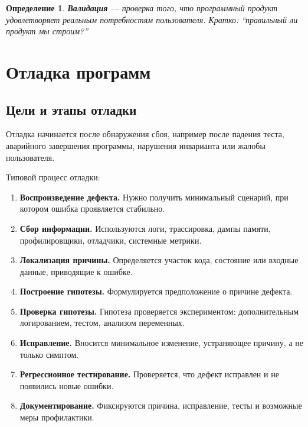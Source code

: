 \documentclass[12pt,a4paper]{article}
\newtheorem{definition}{Определение}
\begin{document}
\begin{definition}
\textbf{Валидация} --- проверка того, что программный продукт удовлетворяет реальным потребностям пользователя. Кратко: ``правильный ли продукт мы строим?''
\end{definition}

\section{Отладка программ}

\subsection{Цели и этапы отладки}

Отладка начинается после обнаружения сбоя, например после падения теста, аварийного завершения программы, нарушения инварианта или жалобы пользователя.

Типовой процесс отладки:

\begin{enumerate}
    \item \textbf{Воспроизведение дефекта.}
    Нужно получить минимальный сценарий, при котором ошибка проявляется стабильно.

    \item \textbf{Сбор информации.}
    Используются логи, трассировка, дампы памяти, профилировщики, отладчики, системные метрики.

    \item \textbf{Локализация причины.}
    Определяется участок кода, состояние или входные данные, приводящие к ошибке.

    \item \textbf{Построение гипотезы.}
    Формулируется предположение о причине дефекта.

    \item \textbf{Проверка гипотезы.}
    Гипотеза проверяется экспериментом: дополнительным логированием, тестом, анализом переменных.

    \item \textbf{Исправление.}
    Вносится минимальное изменение, устраняющее причину, а не только симптом.

    \item \textbf{Регрессионное тестирование.}
    Проверяется, что дефект исправлен и не появились новые ошибки.

    \item \textbf{Документирование.}
    Фиксируются причина, исправление, тесты и возможные меры профилактики.
\end{enumerate}
\end{document}
